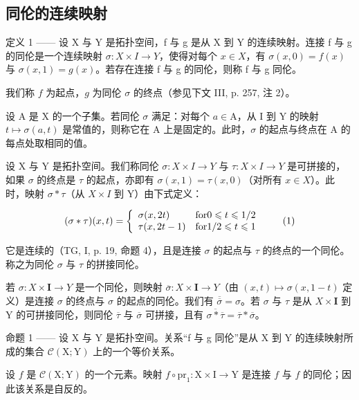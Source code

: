 \subsection{同伦的连续映射}

定义 1 —— 设 X 与 Y 是拓扑空间，f 与 g 是从 X 到 Y 的连续映射。连接 f 与 g 的同伦是一个连续映射 \(\sigma: X \times I \to Y\)，使得对每个 \(x \in X\)，有 \(\sigma(x,0) = f(x)\) 与 \(\sigma(x,1) = g(x)\)。若存在连接 f 与 g 的同伦，则称 f 与 g 同伦。

我们称 \(f\) 为起点，\(g\) 为同伦 \(\sigma\) 的终点（参见下文 III, p. 257, 注 2）。

设 A 是 X 的一个子集。若同伦 \(\sigma\) 满足：对每个 \(a \in \mathrm{A}\)，从 I 到 Y 的映射 \(t \mapsto \sigma(a, t)\) 是常值的，则称它在 A 上是固定的。此时，\(\sigma\) 的起点与终点在 A 的每点处取相同的值。

设 X 与 Y 是拓扑空间。我们称同伦 \(\sigma\colon X\times I\to Y\) 与 \(\tau\colon X\times I\to Y\) 是可拼接的，如果 \(\sigma\) 的终点是 \(\tau\) 的起点，亦即有 \(\sigma(x,1)=\tau(x,0)\)（对所有 \(x\in X\)）。此时，映射 \(\sigma*\tau\)（从 \(X\times I\) 到 Y）由下式定义：

\[
(\sigma * \tau) (x, t) = \left\{ \begin{array}{l l} \sigma (x, 2 t) & \text {for} 0 \leqslant t \leqslant 1 / 2 \\ \tau (x, 2 t - 1) & \text {for} 1 / 2 \leqslant t \leqslant 1 \end{array} \right.\tag{1}
\]

它是连续的（TG, I, p. 19, 命题 4），且是连接 \(\sigma\) 的起点与 \(\tau\) 的终点的一个同伦。称之为同伦 \(\sigma\) 与 \(\tau\) 的拼接同伦。

若 \(\sigma\colon X\times\mathbf{I}\to Y\) 是一个同伦，则映射 \(\overline{\sigma}\colon X\times\mathbf{I}\to Y\)（由 \((x,t)\mapsto\sigma(x,1-t)\) 定义）是连接 \(\sigma\) 的终点与 \(\sigma\) 的起点的同伦。我们有 \(\overline{\overline{\sigma}}=\sigma\)。若 \(\sigma\) 与 \(\tau\) 是从 \(X\times\mathbf{I}\) 到 Y 的可拼接同伦，则同伦 \(\overline{\tau}\) 与 \(\overline{\sigma}\) 可拼接，且有 \(\overline{\sigma*\overline{\tau}}=\overline{\tau}*\overline{\sigma}\)。

命题 1 —— 设 X 与 Y 是拓扑空间。关系“f 与 g 同伦”是从 X 到 Y 的连续映射所成的集合 \(\mathcal{C}(\mathrm{X};\mathrm{Y})\) 上的一个等价关系。

设 \(f\) 是 \(\mathcal{C}(\mathrm{X};\mathrm{Y})\) 的一个元素。映射 \(f\circ\mathrm{pr}_{1}\colon\mathrm{X}\times\mathrm{I}\to\mathrm{Y}\) 是连接 \(f\) 与 \(f\) 的同伦；因此该关系是自反的。

